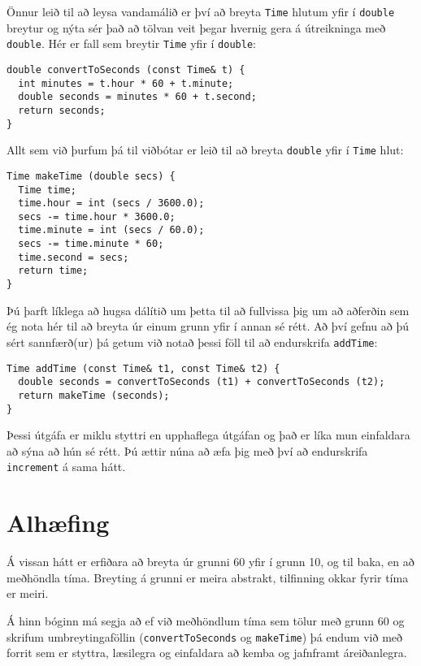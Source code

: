 
Önnur leið til að leysa vandamálið er því að breyta {\tt Time} hlutum yfir í {\tt double} breytur og 
nýta sér það að tölvan veit þegar hvernig gera á útreikninga með {\tt double}.
Hér er fall sem breytir {\tt Time} yfir í {\tt double}:

\begin{verbatim}
double convertToSeconds (const Time& t) {
  int minutes = t.hour * 60 + t.minute;
  double seconds = minutes * 60 + t.second;
  return seconds;
}
\end{verbatim}
%
Allt sem við þurfum þá til viðbótar er leið til að breyta {\tt double} yfir í {\tt Time} hlut:

\begin{verbatim}
Time makeTime (double secs) {
  Time time;
  time.hour = int (secs / 3600.0);
  secs -= time.hour * 3600.0;
  time.minute = int (secs / 60.0);
  secs -= time.minute * 60;
  time.second = secs;
  return time;
}
\end{verbatim}
%
Þú þarft líklega að hugsa dálítið um þetta til að fullvissa þig um að aðferðin sem ég nota hér til að breyta úr einum grunn yfir í annan sé rétt.
Að því gefnu að þú sért sannfærð(ur) þá getum við notað þessi föll til að endurskrifa {\tt addTime}:

\begin{verbatim}
Time addTime (const Time& t1, const Time& t2) {
  double seconds = convertToSeconds (t1) + convertToSeconds (t2);
  return makeTime (seconds);
}
\end{verbatim}
%
Þessi útgáfa er miklu styttri en upphaflega útgáfan og það er líka mun einfaldara að sýna að hún sé rétt.
Þú ættir núna að æfa þig með því að endurskrifa {\tt increment} á sama hátt.

\section{Alhæfing}

Á vissan hátt er erfiðara að breyta úr grunni 60 yfir í grunn 10, og til baka, en að meðhöndla tíma.
Breyting á grunni er meira abstrakt, tilfinning okkar fyrir tíma er meiri.

Á hinn bóginn má segja að ef við meðhöndlum tíma sem tölur með grunn 60 og skrifum umbreytingaföllin
({\tt convertToSeconds} og {\tt makeTime}) þá endum við með forrit sem er styttra, læsilegra og einfaldara að kemba og jafnframt áreiðanlegra.


